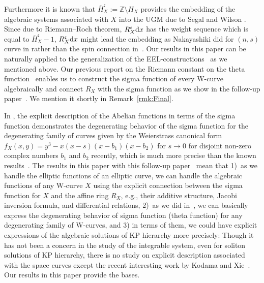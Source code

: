\documentclass[pdftex]{sigma}
\def\ZZ{{\mathbb Z}}
\def\fc{{\mathfrak c}}
\def\BH{{\overline H}}
\numberwithin{equation}{section}
\begin{document}
Furthermore it is known that $\BH_X^\fc := \ZZ \setminus H_X$ provides the embedding of the algebraic systems associated with $X$ into the UGM due to Segal and Wilson \cite[p.~46]{SegalWilson}.
Since due to Riemann--Roch theorem, $R_X^\fc {\rm d} x$ has the weight sequence which is equal to $\BH_X^\fc-1$, $R_X^\fc {\rm d} x$ might lead the embedding as Nakayashiki did for $(n,s)$ curve in \cite{Nak10b} rather than the spin connection in~\cite{Nak16}.
Our results in this paper can be naturally applied to the generalization of the EEL-constructions~\cite{KMP19} as we mentioned above.
Our previous report on the Riemann constant on the theta function~\cite{KMP16} enables us to construct the sigma function of every W-curve algebraically and connect $R_X$ with the sigma function as we show in the follow-up paper~\cite{KMP2022b}. We mention it shortly in Re\-mark~\ref{rmk:Final}.

In \cite{FKMPA}, the explicit description of the Abelian functions in terms of the sigma function demonstrates the degenerating behavior of the sigma function for the degenerating family of curves given by the Weierstrass canonical form $f_X(x,y)=y^3-x(x-s)(x-b_1)(x-b_2)$ for $s \to 0$ for disjoint non-zero complex numbers $b_1$ and $b_2$ recently, which is much more precise than the known results~\cite{Igusa56}.
The results in this paper with this follow-up paper~\cite{KMP2022b} mean that 1)~as we handle the elliptic functions of an elliptic curve, we can handle the algebraic functions of any W-curve $X$ using the explicit connection between the sigma function for $X$ and the affine ring $R_X$, e.g., their additive structure, Jacobi inversion formula, and differential relations, 2)~as we did in~\cite{FKMPA}, we can basically express the degenerating behavior of sigma function (theta function) for any degenerating family of W-curves, and 3) in terms of them, we could have explicit expressions of the algebraic solutions of KP hierarchy more precisely:
Though it has not been a concern in the study of the integrable system, even for soliton solutions of KP hierarchy, there is no study on explicit description associated with the space curves except the recent interesting work by Kodama and Xie~\cite{KodamaX2021}.
Our results in this paper provide the bases.
\end{document}
